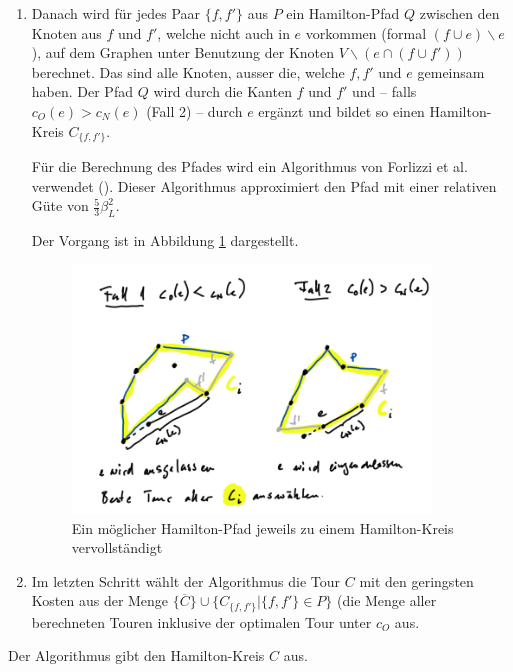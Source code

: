 \documentclass[a4paper,11pt]{scrreprt}
\begin{document}
\begin{enumerate}
\begin{description}
\end{description}

\item Danach wird für jedes Paar $\{f, f'\}$ aus $P$ ein Hamilton-Pfad $Q$ zwischen den Knoten aus $f$ und $f'$, welche nicht auch in $e$ vorkommen (formal $(f \cup e)\backslash e$), auf dem Graphen unter Benutzung der Knoten $V\backslash(e\cap(f\cup f'))$ berechnet. Das sind alle Knoten, ausser die, welche $f, f'$ und $e$ gemeinsam haben. Der Pfad $Q$ wird durch die Kanten $f$ und $f'$ und -- falls $c_O(e) > c_N(e)$ (Fall 2) -- durch $e$ ergänzt und bildet so einen Hamilton-Kreis $C_{\{f, f'\}}$. 

Für die Berechnung des Pfades wird ein Algorithmus von Forlizzi et al. verwendet (\cite{for1}). Dieser Algorithmus approximiert den Pfad mit einer relativen Güte von $\frac{5}{3}\beta_L^2$.

Der Vorgang ist in Abbildung \ref{fig:lm-beta-approx2} dargestellt.

\begin{figure}[H]
\centering
\includegraphics[width=0.9\textwidth]{lm_beta_approx2.png}
\caption{Ein möglicher Hamilton-Pfad jeweils zu einem Hamilton-Kreis vervollständigt}
\label{fig:lm-beta-approx2}
\end{figure}

\item Im letzten Schritt wählt der Algorithmus die Tour $C$ mit den geringsten Kosten aus der Menge $\{\overline{C}\} \cup \{C_{\{f, f'\}} | \{f, f'\} \in P \}$ (die Menge aller berechneten Touren inklusive der optimalen Tour unter $c_O$ aus.
\end{enumerate}

Der Algorithmus gibt den Hamilton-Kreis $C$ aus.
\end{document}
